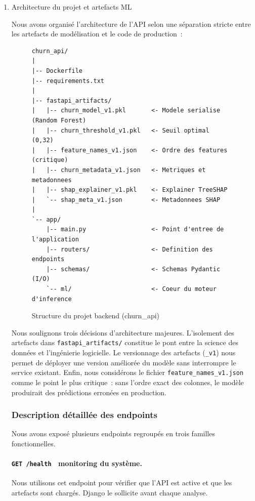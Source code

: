 \begin{enumerate}
\item Architecture du projet et artefacts ML

Nous avons organisé l'architecture de l'API selon une séparation stricte
entre les artefacts de modélisation et le code de production~:

\begin{figure}[htbp]
\centering
\begin{lstlisting}[basicstyle=\ttfamily\small]
churn_api/
|
|-- Dockerfile
|-- requirements.txt
|
|-- fastapi_artifacts/
|   |-- churn_model_v1.pkl       <- Modele serialise (Random Forest)
|   |-- churn_threshold_v1.pkl   <- Seuil optimal (0,32)
|   |-- feature_names_v1.json    <- Ordre des features (critique)
|   |-- churn_metadata_v1.json   <- Metriques et metadonnees
|   |-- shap_explainer_v1.pkl    <- Explainer TreeSHAP
|   `-- shap_meta_v1.json        <- Metadonnees SHAP
|
`-- app/
    |-- main.py                  <- Point d'entree de l'application
    |-- routers/                 <- Definition des endpoints
    |-- schemas/                 <- Schemas Pydantic (I/O)
    `-- ml/                      <- Coeur du moteur d'inference
\end{lstlisting}
\caption{Structure du projet backend (churn\_api)}
\label{fig:archi_projet}
\end{figure}

Nous soulignons trois décisions d'architecture majeures. L'isolement des artefacts dans \texttt{fastapi\_artifacts/} constitue le pont entre la science des
données et l'ingénierie logicielle. Le versionnage des artefacts
(\texttt{\_v1}) nous permet de déployer une version améliorée du modèle
sans interrompre le service existant. Enfin, nous considérons le fichier
\texttt{feature\_names\_v1.json} comme le point le plus critique~: sans l'ordre exact des colonnes, le modèle
produirait des prédictions erronées en production.

\subsubsection{Description détaillée des endpoints}

Nous avons exposé plusieurs endpoints regroupés en trois familles
fonctionnelles.

\paragraph{\texttt{GET /health}~ monitoring du système.}
Nous utilisons cet endpoint pour vérifier que l'API est active et que
les artefacts sont chargés. Django le sollicite avant chaque analyse.


\end{enumerate}
